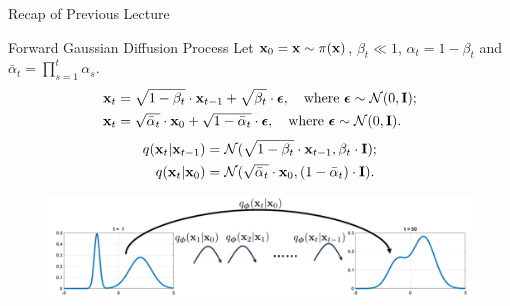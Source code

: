 \documentclass{beamer}
\begin{document}
\begin{frame}{Recap of Previous Lecture}
    \begin{block}{Forward Gaussian Diffusion Process}
        Let $\mathbf{x}_0 = \mathbf{x} \sim \pi(\mathbf{x})$, $\beta_t \ll 1$, $\alpha_t = 1 - \beta_t$ and $\bar{\alpha}_t = \prod_{s=1}^t \alpha_s$. 
        \begin{align*}
            \mathbf{x}_t &= \sqrt{1 - \beta_t} \cdot \mathbf{x}_{t - 1} + \sqrt{\beta_t} \cdot \boldsymbol{\epsilon}, \quad \text{where }\boldsymbol{\epsilon} \sim \mathcal{N}(0, \mathbf{I}); \\
            \mathbf{x}_t &= \sqrt{\bar{\alpha}_t} \cdot \mathbf{x}_{0} + \sqrt{1 - \bar{\alpha}_t} \cdot \boldsymbol{\epsilon}, \quad \text{where } \boldsymbol{\epsilon} \sim \mathcal{N}(0, \mathbf{I}).
        \end{align*}
        \vspace{-0.6cm}
        \begin{align*}
            q(\mathbf{x}_t | \mathbf{x}_{t-1}) &= \mathcal{N}(\sqrt{1 - \beta_t} \cdot \mathbf{x}_{t-1}, \beta_t \cdot \mathbf{I}); \\
            q(\mathbf{x}_t | \mathbf{x}_0) &= \mathcal{N}(\sqrt{\bar{\alpha}_t} \cdot \mathbf{x}_0, (1 - \bar{\alpha}_t) \cdot \mathbf{I}).
        \end{align*}
        \vspace{-0.6cm}
    \end{block}
    \begin{figure}
        \includegraphics[width=0.8\linewidth]{figs/conditional_diffusion}
    \end{figure}
\end{frame}
\end{document}
